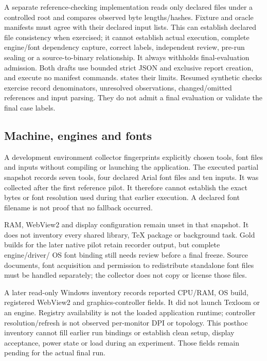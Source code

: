 A separate reference-checking implementation reads only declared files
under a controlled root and compares observed byte lengths/hashes. Fixture
and oracle manifests must agree with their declared input lists. This can
establish declared file consistency when exercised; it cannot establish
actual execution, complete engine/font dependency capture, correct labels,
independent review, pre-run sealing or a source-to-binary relationship. It
always withholds final-evaluation admission. Both drafts use bounded strict
JSON and exclusive report creation, and execute no manifest commands.
 states their limits. Resumed synthetic
checks exercise record denominators, unresolved observations, changed/omitted
references and input parsing. They do not admit a final evaluation or validate
the final case labels.

\subsection{Machine, engines and fonts}
A development environment collector fingerprints explicitly chosen tools,
font files and inputs without compiling or launching the application. The
executed partial snapshot records seven tools, four declared Arial font files
and ten inputs. It was collected after the first reference pilot. It therefore
cannot establish the exact bytes or font resolution used during that earlier
execution. A declared font filename is not proof that no fallback occurred.

RAM, WebView2 and display configuration remain unset in that snapshot. It does
not inventory every shared library, TeX package or background task. Gold builds
for the later native pilot retain recorder output, but complete engine/driver/
OS font binding still needs review before a final freeze. Source documents,
font acquisition and permission to redistribute standalone font files must be
handled separately; the collector does not copy or license those files.

A later read-only Windows inventory records reported CPU/RAM, OS build,
registered WebView2 and graphics-controller fields. It did not launch Texloom
or an engine. Registry availability is not the loaded application runtime;
controller resolution/refresh is not observed per-monitor DPI or topology.
This posthoc inventory cannot fill earlier run bindings or establish clean
setup, display acceptance, power state or load during an experiment. Those
fields remain pending for the actual final run.

